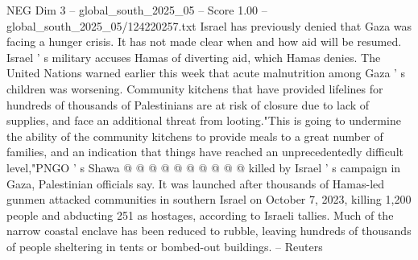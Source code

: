 \begin{textsample}{NEG Dim 3 – global\_south\_2025\_05 – Score 1.00 – global\_south\_2025\_05/124220257.txt}
Israel has previously denied that Gaza was facing a hunger crisis.
It has not made clear when and how aid will be resumed.
Israel ' s military accuses Hamas of diverting aid, which Hamas denies.
The United Nations warned earlier this week that acute malnutrition among Gaza ' s children was worsening.
Community kitchens that have provided lifelines for hundreds of thousands of Palestinians are at risk of closure due to lack of supplies, and face an additional threat from looting."This is going to undermine the ability of the community kitchens to provide meals to a great number of families, and an indication that things have reached an unprecedentedly difficult level,"PNGO ' s Shawa @ @ @ @ @ @ @ @ @ @ killed by Israel ' s campaign in Gaza, Palestinian officials say.
It was launched after thousands of Hamas-led gunmen attacked communities in southern Israel on October 7, 2023, killing 1,200 people and abducting 251 as hostages, according to Israeli tallies.
Much of the narrow coastal enclave has been reduced to rubble, leaving hundreds of thousands of people sheltering in tents or bombed-out buildings. -- Reuters

\end{textsample}
